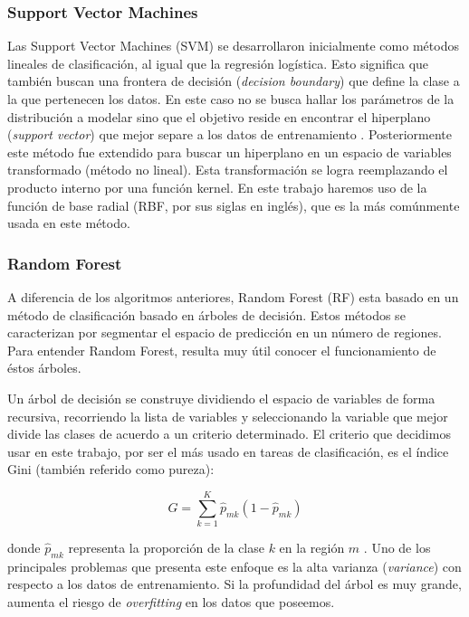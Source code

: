 \subsubsection{Support Vector Machines}

Las Support Vector Machines (SVM) se desarrollaron inicialmente como métodos lineales de clasificación, al igual que la regresión logística. Esto significa que también buscan una frontera de decisión (\textit{decision boundary}) que define la clase a la que pertenecen los datos. En este caso no se busca hallar los parámetros de la distribución a modelar sino que el objetivo reside en encontrar el hiperplano (\textit{support vector}) que mejor separe a los datos de entrenamiento \cite{Hastie2001}. Posteriormente este método fue extendido para buscar un hiperplano en un espacio de variables transformado (método no lineal). Esta transformación se logra reemplazando el producto interno por una función kernel. En este trabajo haremos uso de la función de base radial (RBF, por sus siglas en inglés), que es la más comúnmente usada en este método.

\subsubsection{Random Forest}

A diferencia de los algoritmos anteriores, Random Forest (RF) esta basado en un método de clasificación basado en árboles de decisión. Estos métodos se caracterizan por segmentar el espacio de predicción en un número de regiones. Para entender Random Forest, resulta muy útil conocer el funcionamiento de éstos árboles. 

Un árbol de decisión se construye dividiendo el espacio de variables de forma recursiva, recorriendo la lista de variables y seleccionando la variable que mejor divide las clases de acuerdo a un criterio determinado. El criterio que decidimos usar en este trabajo, por ser el más usado en tareas de clasificación, es el índice Gini (también referido como pureza):

\begin{equation*}
    G = \sum_{k = 1}^{K} \hat{p}_{mk}(1 - \hat{p}_{mk})
\end{equation*}

donde $\hat{p}_{mk}$ representa la proporción de la clase $k$ en la región $m$ \cite{Hastie2001}. Uno de los principales problemas que presenta este enfoque es la alta varianza (\textit{variance}) con respecto a los datos de entrenamiento. Si la profundidad del árbol es muy grande, aumenta el riesgo de \textit{overfitting} en los datos que poseemos. 

